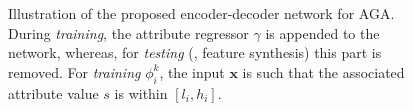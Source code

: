 \documentclass[10pt,twocolumn,letterpaper]{article}
\begin{document}
\begin{figure}
\caption{Illustration of the proposed encoder-decoder network for AGA.
During \emph{training}, the attribute regressor $\gamma$ is appended to
the network, whereas, for \emph{testing} (\ie, feature synthesis) 
this part is removed. For \emph{training} $\phi_i^k$, the input $\mathbf{x}$ 
is such that the associated attribute value $s$ is within $[l_i,h_i]$.
\label{fig:EDN}}
\end{figure}
\end{document}
